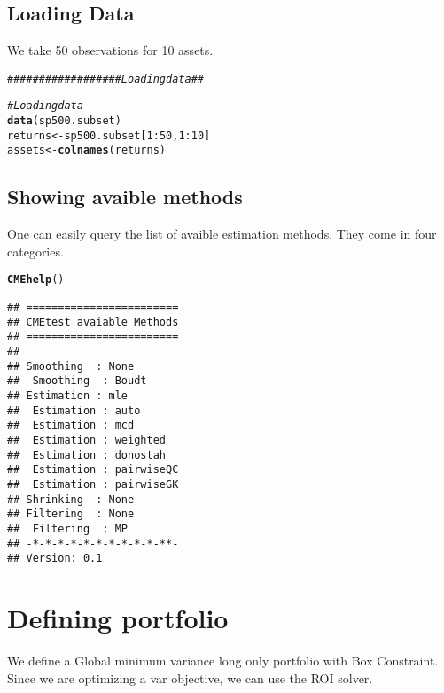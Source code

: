 \documentclass[12pt,letterpaper,english]{article}\usepackage[]{graphicx}\usepackage[]{color}
\makeatletter
\newcommand{\hlnum}[1]{\textcolor[rgb]{0.686,0.059,0.569}{#1}}%
\newcommand{\hlcom}[1]{\textcolor[rgb]{0.678,0.584,0.686}{\textit{#1}}}%
\newcommand{\hlopt}[1]{\textcolor[rgb]{0,0,0}{#1}}%
\newcommand{\hlstd}[1]{\textcolor[rgb]{0.345,0.345,0.345}{#1}}%
\newcommand{\hlkwb}[1]{\textcolor[rgb]{0.69,0.353,0.396}{#1}}%
\newcommand{\hlkwd}[1]{\textcolor[rgb]{0.737,0.353,0.396}{\textbf{#1}}}%
\newenvironment{kframe}{%
 \def\at@end@of@kframe{}%
 \ifinner\ifhmode%
  \def\at@end@of@kframe{\end{minipage}}%
  \begin{minipage}{\columnwidth}%
 \fi\fi%
 \def\FrameCommand##1{\hskip\@totalleftmargin \hskip-\fboxsep
 \colorbox{shadecolor}{##1}\hskip-\fboxsep
     \hskip-\linewidth \hskip-\@totalleftmargin \hskip\columnwidth}%
 \MakeFramed {\advance\hsize-\width
   \@totalleftmargin\z@ \linewidth\hsize
   \@setminipage}}%
 {\par\unskip\endMakeFramed%
 \at@end@of@kframe}
\newenvironment{knitrout}{}{} %
\makeatother
\begin{document}
\subsection{Loading Data}
We take 50 observations for 10 assets.
\begin{knitrout}
\color{fgcolor}\begin{kframe}
\begin{alltt}
\hlcom{################## Loading data ##}

\hlcom{# Loading data}
\hlkwd{data}\hlstd{(sp500.subset)}
\hlstd{returns} \hlkwb{<-} \hlstd{sp500.subset[}\hlnum{1}\hlopt{:}\hlnum{50}\hlstd{,} \hlnum{1}\hlopt{:}\hlnum{10}\hlstd{]}
\hlstd{assets} \hlkwb{<-} \hlkwd{colnames}\hlstd{(returns)}
\end{alltt}
\end{kframe}
\end{knitrout}


\subsection{Showing avaible methods}
One can easily query the list of avaible estimation methods. They come in four categories.
\begin{knitrout}
\color{fgcolor}\begin{kframe}
\begin{alltt}
\hlkwd{CMEhelp}\hlstd{()}
\end{alltt}
\begin{verbatim}
## ========================
## CMEtest avaiable Methods
## ========================
## 
## Smoothing  : None 
##  Smoothing  : Boudt 
## Estimation : mle 
##  Estimation : auto 
##  Estimation : mcd 
##  Estimation : weighted 
##  Estimation : donostah 
##  Estimation : pairwiseQC 
##  Estimation : pairwiseGK 
## Shrinking  : None 
## Filtering  : None 
##  Filtering  : MP 
## -*-*-*-*-*-*-*-*-*-*-**-
## Version: 0.1
\end{verbatim}
\end{kframe}
\end{knitrout}



\section{Defining portfolio}

We define a Global minimum variance long only portfolio with Box Constraint. Since we are optimizing a var objective, we can use the ROI solver.
\end{document}
